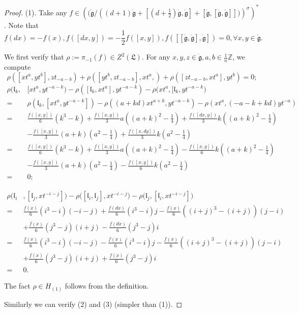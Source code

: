 \documentclass[1p]{elsarticle}
\numberwithin{equation}{section}
\def\dg{\dot{\mathfrak{g}}}
\def\fL{\mathfrak{L}}
\def\bZ{\mathbb{Z}}
\def\fl{\mathfrak{l}}
\begin{document}
\begin{proof} (1).
	Take any $f\in  \left (\Big (\dg\Big/\left ((d+1)\dg+[(d+\frac 12)\dg,\dg]+[\dg,[\dg,\dg]]\Big)\right)^{\sigma}\right)^*$. Note that
	$$f(dx)=-f(x), f([dx, y])=-\frac12  f([x, y]), f([[\dg, \dg],\dg])=0, \forall x,y\in\dg.
	$$


 We first verify that $\rho:=\pi_{-1}(f)\in Z^2(\fL)$.
For any $x,y,z\in\dg, a,b\in \frac 1n\bZ$, we compute
\[
\rho([xt^a,yt^{b}], zt_{-a-b})+\rho([yt^{b}, zt_{-a-b}], xt^a,)+\rho([ zt_{-a-b},xt^a],yt^{b})=0;
\]
\[\begin{aligned}
\rho\big(\fl_k,&[xt^a,yt^{-a-k})-\rho([\fl_k,xt^a],yt^{-a-k})-\rho(xt^a,[\fl_k,yt^{-a-k}\big)\\
=&\rho(\fl_{k},[xt^a, yt^{-a-k}])-\rho((a+k d) x t^{a+k}, y t^{-a-k})-\rho(x t^a,(-a-k+k d) y t^{-a}) \\
=&\frac{f([x, y])}{6}(k^{3}-k)+\frac{f([x, y])}{3} a((a+k)^{2}-\frac{1}{4})+\frac{f([d x, y])}{3} k((a+k)^{2}-\frac{1}{4}) \\
&-\frac{f([x, y])}{3}(a+k)(a^{2}-\frac{1}{4})+\frac{f([x, d y])}{3} k(a^{2}-\frac{1}{4}) \\
=&\frac{f([x, y])}{6}(k^{3}-k)+\frac{f([x, y])}{3}a((a+k)^{2}-\frac{1}{4})-\frac{f([x, y])}{6} k((a+k)^{2}-\frac{1}{4}) \\
&-\frac{f([x, y])}{3}(a+k)(a^{2}-\frac{1}{4})-\frac{f([x, y])}{6} k(a^{2}-\frac{1}{4}) \\
=&0;
\end{aligned}\]

$\begin{aligned}\rho\big(\fl_{i}&,\left[\fl_{j}, x t^{-i-j}\right]\big)-\rho\big(\left[\fl_{i}, \fl_{j}\right], x t^{-i-j}\big)-\rho\big(\fl_{j},\left[\fl_{i}, x t^{-i-j}\right]\big) \\ =&\frac{f(x)}{6}(i^{3}-i)(-i-j)+\frac{f(d x)}{6}(i^{3}-i) j-\frac{f(x)}{6}((i+j)^{3}-(i+j))(j-i) \\ &+\frac{f(x)}{6}(j^{3}-j)(i+j)-\frac{f(d x)}{6}(j^{3}-j) i \\ =&\frac{f(x)}{6}(i^{3}-i)(-i-j)-\frac{f(x)}{6}(i^{3}-i) j-\frac{f(x)}{6}((i+j)^{3}-(i+j))(j-i) \\ &+\frac{f(x)}{6}(j^{3}-j)(i+j)+\frac{f(x)}{6}(j^{3}-j) i \\   =&0.\end{aligned}$

The fact $\rho\in H_{(1)}$ follows from the definition.

Similarly we can verify (2) and (3) (simpler than (1)).  
 \end{proof}
\end{document}
